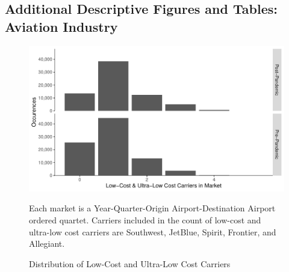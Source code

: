 \documentclass{article}
\begin{document}
\begin{appendices}
    \subsection{Additional Descriptive Figures and Tables: Aviation Industry}
    \begin{figure}[h]
        \caption{Distribution of Low-Cost and Ultra-Low Cost Carriers}
        \label{fig:LCC_Distribution}
        \begin{center}
    \includegraphics{05.Figures/LCC_Market_Graph.pdf}
        \end{center}
        \footnotesize{Each market is a Year-Quarter-Origin Airport-Destination Airport ordered quartet. Carriers included in the count of low-cost and ultra-low cost carriers are Southwest, JetBlue, Spirit, Frontier, and Allegiant.}
    \end{figure}
    \FloatBarrier
    

\end{appendices}
\end{document}
